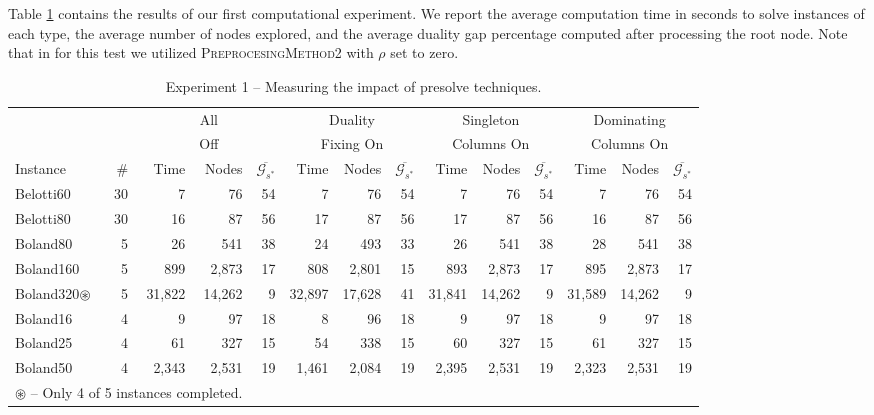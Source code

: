 \documentclass[11.5pt]{article}
\newcommand\Tstrut{\rule{0pt}{3ex}}
\begin{document}
Table \ref{table_presolve} contains the results of our first computational experiment. We report the average computation time in seconds to solve instances of each type, the average number of nodes explored, and the average duality gap percentage computed after processing the root node. Note that in for this test we utilized \textsc{PreprocesingMethod2} with $\rho$ set to zero.

 \begin{table}%
\footnotesize
\centering
\caption{Experiment 1 -- Measuring the impact of presolve techniques.}\label{table_presolve}
\begin{tabular}{l|r|rrr|rrr|rrr|rrr}
\toprule
 &  & \multicolumn{3}{c}{All} & \multicolumn{3}{c}{Duality} & \multicolumn{3}{c}{Singleton} & \multicolumn{3}{c}{Dominating}\\ 
  & & \multicolumn{3}{c}{Off} & \multicolumn{3}{c}{Fixing On} & \multicolumn{3}{c}{Columns On} & \multicolumn{3}{c}{Columns On}\\
\cmidrule(r){3-5}
\cmidrule(r){6-8}
\cmidrule(r){9-11}
\cmidrule(r){12-14}
Instance & \# & Time & Nodes & $\overline{\mathcal{G}_{s^*}}$ & Time & Nodes & $\overline{\mathcal{G}_{s^*}}$ & Time & Nodes & $\overline{\mathcal{G}_{s^*}}$ & Time & Nodes & $\overline{\mathcal{G}_{s^*}}$  \\ 
\midrule
Belotti60 & 30 & 7 & 76 & 54 & 7  & 76 & 54 & 7 & 76 & 54 & 7 & 76 & 54\\
Belotti80 & 30 & 16 & 87 & 56 & 17 & 87 & 56 & 17 & 87 & 56 & 16 & 87 & 56\\
\midrule
Boland80 & 5 & 26 & 541 & 38 & 24 & 493 & 33 & 26 & 541 & 38 & 28 & 541 & 38\\
Boland160 & 5 & 899 & 2,873 & 17 & 808 & 2,801 & 15 & 893 & 2,873 & 17 & 895 & 2,873 & 17\\
Boland320$\circledast$ & 5 & 31,822 & 14,262 &9 &32,897 &17,628 &41 &31,841 &14,262 &9 &31,589 &14,262 &9 \\
Boland16 & 4 & 9 & 97 & 18 & 8 & 96 & 18 & 9 & 97 & 18 & 9 & 97 & 18 \\
Boland25 & 4 & 61 & 327 & 15 & 54 & 338 & 15 & 60 & 327 & 15 & 61 & 327 & 15\\
Boland50 & 4 & 2,343 & 2,531 & 19 & 1,461 & 2,084 & 19 & 2,395 & 2,531 & 19 & 2,323 & 2,531 & 19 \\
\bottomrule
\multicolumn{4}{l}{\scriptsize $\circledast$ -- Only 4 of 5 instances completed.\Tstrut}
\end{tabular}
\end{table}
\end{document}
